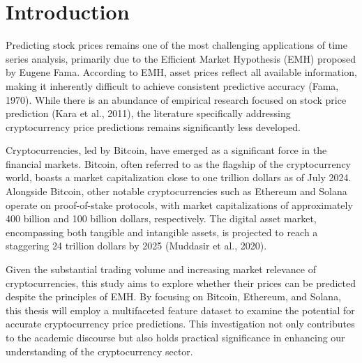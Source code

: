 \chapter*{Introduction}
\setcounter{chapter}{1}


Predicting stock prices remains one of the most challenging applications of time series analysis, primarily due to the Efficient Market Hypothesis (EMH) proposed by Eugene Fama. 
According to EMH, asset prices reflect all available information, making it inherently difficult to achieve consistent predictive accuracy (Fama, 1970). 
While there is an abundance of empirical research focused on stock price prediction (Kara et al., 2011), the literature specifically addressing cryptocurrency price predictions 
remains significantly less developed.


Cryptocurrencies, led by Bitcoin, have emerged as a significant force in the financial markets. 
Bitcoin, often referred to as the flagship of the cryptocurrency world, boasts a market capitalization close to one trillion dollars as of July 2024. 
Alongside Bitcoin, other notable cryptocurrencies such as Ethereum and Solana operate on proof-of-stake protocols, with market capitalizations of approximately 
400 billion and 100 billion dollars, respectively. The digital asset market, encompassing both tangible and intangible assets, is projected to reach a staggering
 24 trillion dollars by 2025 (Muddasir et al., 2020).


Given the substantial trading volume and increasing market relevance of cryptocurrencies, this study aims to explore whether their prices can be predicted despite the principles of EMH. 
By focusing on Bitcoin, Ethereum, and Solana, this thesis will employ a multifaceted feature dataset to examine the potential for accurate cryptocurrency price predictions. 
This investigation not only contributes to the academic discourse but also holds practical significance in enhancing our understanding of the cryptocurrency sector.
